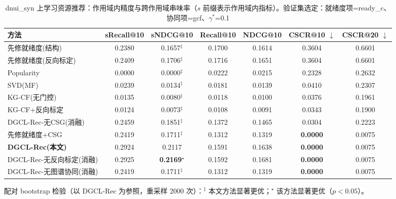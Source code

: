 \begin{table}[htbp]
\centering
\caption{dnui_syn 上学习资源推荐：作用域内精度与跨作用域串味率（$s$ 前缀表示作用域内指标）。验证集选定：就绪度项=ready_c、协同项=gcf、$\gamma^\ast$=0.1}
\label{tab:rec_dnui_syn}
\begin{tabular}{lcccccc}
\toprule
方法 & sRecall@10 & sNDCG@10 & Recall@10 & NDCG@10 & CSCR@10 $\downarrow$ & CSCR@20 $\downarrow$ \\
\midrule
先修就绪度(结构) & 0.2380 & 0.1657$^{\ddagger}$ & 0.1700 & 0.1614 & 0.3604 & 0.6601 \\
先修就绪度(反向标定) & 0.2409 & 0.1706$^{\ddagger}$ & 0.1716 & 0.1651 & 0.3604 & 0.6601 \\
Popularity & 0.0000 & 0.0000$^{\ddagger}$ & 0.0222 & 0.0215 & 0.2328 & 0.2632 \\
SVD(MF) & 0.0239 & 0.0134$^{\ddagger}$ & 0.0181 & 0.0139 & 0.0410 & 0.2307 \\
KG-CF(无门控) & 0.0135 & 0.0080$^{\ddagger}$ & 0.0118 & 0.0100 & 0.0376 & 0.1961 \\
KG-CF+反向标定 & 0.0124 & 0.0073$^{\ddagger}$ & 0.0108 & 0.0091 & 0.0343 & 0.1900 \\
DGCL-Rec-无CSG(消融) & 0.2459 & 0.1851$^{\ddagger}$ & 0.1372 & 0.1465 & 0.0304 & 0.2223 \\
先修就绪度+CSG & 0.2419 & 0.1711$^{\ddagger}$ & 0.1312 & 0.1319 & \textbf{0.0000} & 0.0075 \\
\textbf{DGCL-Rec(本文)} & 0.2924 & 0.2117 & 0.1591 & 0.1638 & \textbf{0.0000} & 0.0075 \\
DGCL-Rec-无反向标定(消融) & 0.2925 & \textbf{0.2169}$^{\star}$ & 0.1592 & 0.1681 & \textbf{0.0000} & 0.0075 \\
DGCL-Rec-无图谱协同(消融) & 0.2419 & 0.1711$^{\ddagger}$ & 0.1312 & 0.1319 & \textbf{0.0000} & 0.0075 \\
\bottomrule
\end{tabular}
\par\smallskip\footnotesize 配对 bootstrap 检验（以 DGCL-Rec 为参照，重采样 2000 次）：$^{\ddagger}$ 本文方法显著更优；$^{\star}$ 该方法显著更优（$p<0.05$）。
\end{table}